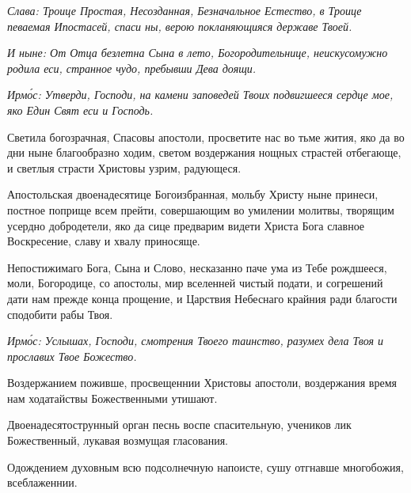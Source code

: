 \itshape Слава\normalfont{}: Троице Простая, Несозданная, Безначальное Естество, в Троице певаемая Ипостасей, спаси ны, верою покланяющияся державе Твоей.

\itshape И ныне\normalfont{}: От Отца безлетна Сына в лето, Богородительнице, неискусомужно родила еси, странное чудо, пребывши Дева доящи.

\itshape Ирм\'{о}с\normalfont{}: Утверди, Господи, на камени заповедей Твоих подвигшееся сердце мое, яко Един Свят еси и Господь. 


Светила богозрачная, Спасовы апостоли, просветите нас во тьме жития, яко да во дни ныне благообразно ходим, светом воздержания нощных страстей отбегающе, и светлыя страсти Христовы узрим, радующеся. 


Апостольская двоенадесятице Богоизбранная, мольбу Христу ныне принеси, постное поприще всем прейти, совершающим во умилении молитвы, творящим усердно добродетели, яко да сице предварим видети Христа Бога славное Воскресение, славу и хвалу приносяще. 


Непостижимаго Бога, Сына и Слово, несказанно паче ума из Тебе рождшееся, моли, Богородице, со апостолы, мир вселенней чистый подати, и согрешений дати нам прежде конца прощение, и Царствия Небеснаго крайния ради благости сподобити рабы Твоя. 



\itshape Ирм\'{о}с\normalfont{}: Услышах, Господи, смотрения Твоего таинство, разумех дела Твоя и прославих Твое Божество.


Воздержанием поживше, просвещеннии Христовы апостоли, воздержания время нам ходатайствы Божественными утишают.


Двоенадесятострунный орган песнь воспе спасительную, учеников лик Божественный, лукавая возмущая гласования.


Одождением духовным всю подсолнечную напоисте, сушу отгнавше многобожия, всеблаженнии.

